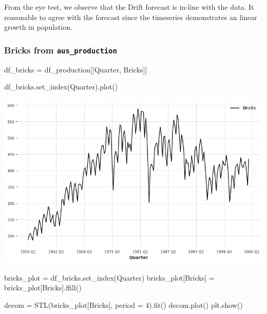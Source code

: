 \documentclass[
  11pt,
]{article}
\newenvironment{Shaded}{\begin{snugshade}}{\end{snugshade}}
\newcommand{\DecValTok}[1]{\textcolor[rgb]{0.68,0.00,0.00}{#1}}
\newcommand{\NormalTok}[1]{\textcolor[rgb]{0.00,0.23,0.31}{#1}}
\newcommand{\OperatorTok}[1]{\textcolor[rgb]{0.37,0.37,0.37}{#1}}
\newcommand{\StringTok}[1]{\textcolor[rgb]{0.13,0.47,0.30}{#1}}
\begin{document}
From the eye test, we observe that the Drift forecast is in-line with
the data. It reasonable to agree with the forecast since the timeseries
demonstrates an linear growth in population.

\subsubsection{\texorpdfstring{Bricks from
\texttt{aus\_production}}{Bricks from aus\_production}}\label{bricks-from-aus_production}

\begin{Shaded}
\begin{Highlighting}[]
\NormalTok{df\_bricks }\OperatorTok{=}\NormalTok{ df\_production[[}\StringTok{\textquotesingle{}Quarter\textquotesingle{}}\NormalTok{, }\StringTok{\textquotesingle{}Bricks\textquotesingle{}}\NormalTok{]]}
\end{Highlighting}
\end{Shaded}

\begin{Shaded}
\begin{Highlighting}[]
\NormalTok{df\_bricks.set\_index(}\StringTok{\textquotesingle{}Quarter\textquotesingle{}}\NormalTok{).plot()}
\end{Highlighting}
\end{Shaded}

\includegraphics{hw3_files/figure-pdf/cell-11-output-1.png}

\begin{Shaded}
\begin{Highlighting}[]
\NormalTok{bricks\_plot }\OperatorTok{=}\NormalTok{ df\_bricks.set\_index(}\StringTok{\textquotesingle{}Quarter\textquotesingle{}}\NormalTok{)}
\NormalTok{bricks\_plot[}\StringTok{\textquotesingle{}Bricks\textquotesingle{}}\NormalTok{] }\OperatorTok{=}\NormalTok{ bricks\_plot[}\StringTok{\textquotesingle{}Bricks\textquotesingle{}}\NormalTok{].ffill()}

\NormalTok{decom }\OperatorTok{=}\NormalTok{ STL(bricks\_plot[}\StringTok{\textquotesingle{}Bricks\textquotesingle{}}\NormalTok{], period }\OperatorTok{=} \DecValTok{4}\NormalTok{).fit()}
\NormalTok{decom.plot()}
\NormalTok{plt.show()}
\end{Highlighting}
\end{Shaded}
\end{document}
